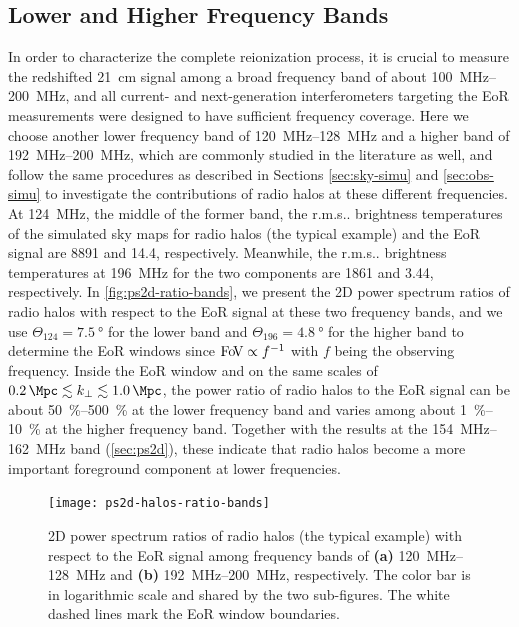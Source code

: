 \documentclass[modern]{aastex62}
\makeatletter
\newcommand{\kperp}{\text{$k_{\bot}$}}
\newcommand{\fov}{\text{Fo\!V}}
\newcommand{\rms}{r.m.s\@ifnextchar.{}{.\@}}
\makeatother
\begin{document}
\subsection{Lower and Higher Frequency Bands}
\label{sec:freq-bands}

In order to characterize the complete reionization process, it is crucial
to measure the redshifted 21~cm signal among a broad frequency band of
about \SIrange{100}{200}{\MHz}, and all current- and next-generation
interferometers targeting the EoR measurements were designed to have
sufficient frequency coverage.
Here we choose another lower frequency band of \SIrange{120}{128}{\MHz}
and a higher band of \SIrange{192}{200}{\MHz}, which are commonly studied
in the literature as well, and follow the same procedures as described
in Sections \ref{sec:sky-simu} and \ref{sec:obs-simu} to investigate the
contributions of radio halos at these different frequencies.
At \SI{124}{\MHz}, the middle of the former band, the \rms{} brightness
temperatures of the simulated sky maps for radio halos (the typical
example) and the EoR signal are \SI{8891}{\mK} and \SI{14.4}{\mK},
respectively.
Meanwhile, the \rms{} brightness temperatures at \SI{196}{\MHz}
for the two components are \SI{1861}{\mK} and \SI{3.44}{\mK},
respectively.
In \autoref{fig:ps2d-ratio-bands}, we present the 2D power spectrum
ratios of radio halos with respect to the EoR signal at these two
frequency bands, and we use $\Theta_{124} = \SI{7.5}{\degree}$ for the
lower band and $\Theta_{196} = \SI{4.8}{\degree}$ for the higher band
to determine the EoR windows since $\fov \propto f^{-1}$ with $f$ being
the observing frequency.
Inside the EoR window and on the same scales of
$\SI{0.2}{\per\Mpc} \lesssim \kperp \lesssim \SI{1.0}{\per\Mpc}$,
the power ratio of radio halos to the EoR signal can be about
\SIrange[range-units=repeat]{50}{500}{\percent} at the lower frequency
band and varies among about \SIrange[range-units=repeat]{1}{10}{\percent}
at the higher frequency band.
Together with the results at the \SIrange{154}{162}{\MHz} band
(\autoref{sec:ps2d}), these indicate that radio halos become a more
important foreground component at lower frequencies.

\begin{figure}
  \centering
  \texttt{[image: ps2d-halos-ratio-bands]}
  \caption{\label{fig:ps2d-ratio-bands}%
    2D power spectrum ratios of radio halos (the typical example) with
    respect to the EoR signal among frequency bands of
    \textbf{(a)} \SIrange{120}{128}{\MHz} and
    \textbf{(b)} \SIrange{192}{200}{\MHz}, respectively.
    The color bar is in logarithmic scale and shared by the
    two sub-figures.
    The white dashed lines mark the EoR window boundaries.
  }
\end{figure}
\end{document}
